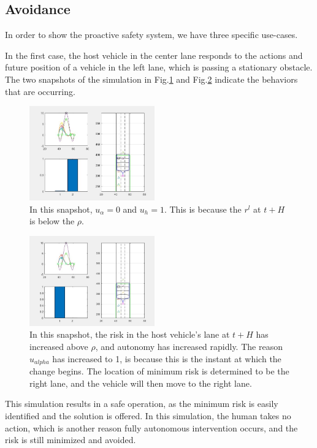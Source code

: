\documentclass[letterpaper, 10 pt, conference]{ieeeconf}  %
\begin{document}
 
\subsection{Avoidance}
In order to show the proactive safety system, we have three specific use-cases.

In the first case, the host vehicle in the center lane responds to the actions and future position of a vehicle in the left lane, which is passing a stationary obstacle. The two snapshots of the simulation in Fig.\ref{fig:cs1} and Fig.\ref{fig:cs1b} indicate the behaviors that are occurring.

\begin{figure}[ht]
    \includegraphics[width=0.48\textwidth]{cs1.JPG}
    \caption{In this snapshot, $u_{\alpha} = 0$ and $u_{h} = 1$. This is because the $r^l$ at $t+H$ is below the $\rho$.}
    \label{fig:cs1}
\end{figure}

\begin{figure}[ht]
    \includegraphics[width=0.48\textwidth]{cs1b.JPG}
    \caption{In this snapshot, the risk in the host vehicle's lane at $t+H$ has increased above $\rho$, and autonomy has increased rapidly. The reason $u_{alpha}$ has increased to 1, is because this is the instant at which the change begins. The location of minimum risk is determined to be the right lane, and the vehicle will then move to the right lane.}
    \label{fig:cs1b}
\end{figure}

This simulation results in a safe operation, as the minimum risk is easily identified and the solution is offered. In this simulation, the human takes no action, which is another reason fully autonomous intervention occurs, and the risk is still minimized and avoided.
\end{document}
